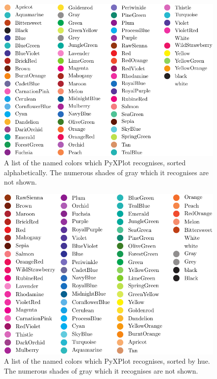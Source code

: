 \begin{figure}
\begin{center}
\includegraphics[width=\textwidth]{figures/pyx_colors2}
\end{center}
\caption[A list of the named colors which PyXPlot recognises, sorted alphabetically]
{A list of the named colors which PyXPlot recognises, sorted alphabetically. The numerous shades of gray which it recognises are not shown.}
\label{fig:color_table1}
\end{figure}

\begin{figure}
\begin{center}
\includegraphics[width=\textwidth]{figures/pyx_colors3}
\end{center}
\caption[A list of the named colors which PyXPlot recognises, sorted by hue]
{A list of the named colors which PyXPlot recognises, sorted by hue. The numerous shades of gray which it recognises are not shown.}
\label{fig:color_table2}
\end{figure}


